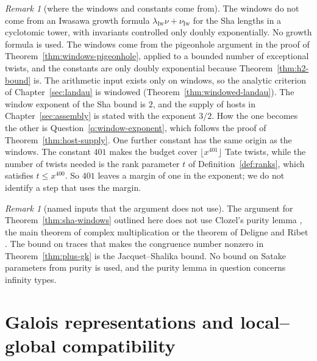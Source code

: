\documentclass[11pt]{amsbook}
\theoremstyle{plain}
\theoremstyle{definition}
\theoremstyle{remark}
\newtheorem{remark}[theorem]{Remark}
\numberwithin{equation}{section}
\numberwithin{figure}{chapter}
\numberwithin{table}{chapter}
\begin{document}
\begin{remark}[where the windows and constants come from]
\label{rem:windows-origin}
The windows do not come from an Iwasawa growth formula
$\lambda_{\mathrm{Iw}}\nu+\nu_{\mathrm{Iw}}$ for the Sha lengths in a
cyclotomic tower, with invariants controlled only doubly
exponentially. No growth formula is used. The windows come from
the pigeonhole argument in the proof of
Theorem~\ref{thm:windows-pigeonhole}, applied to a bounded number of
exceptional twists, and the constants are only doubly exponential
because Theorem~\ref{thm:h2-bound} is. The arithmetic input exists
only on windows, so the analytic criterion of
Chapter~\ref{sec:landau} is windowed
(Theorem~\ref{thm:windowed-landau}). The window exponent of the Sha bound is
$2$, and the
supply of hosts in Chapter~\ref{sec:assembly} is stated with the
exponent $3/2$. How the one becomes the other is
Question~\ref{q:window-exponent}, which follows the proof of
Theorem~\ref{thm:host-supply}. One further constant has the
same origin as the windows. The constant $401$ makes the
budget cover $\lfloor x^{401}\rfloor$ Tate twists, while the number of
twists needed is the rank parameter $t$ of
Definition~\ref{def:ranks}, which satisfies $t\le x^{400}$. So $401$
leaves a margin of one in the exponent; we do not identify a step
that uses the margin.
\end{remark}

\begin{remark}[named inputs that the argument does not use]
\label{rem:unused-inputs}
The argument for Theorem~\ref{thm:sha-windows} outlined here does not
use Clozel's purity lemma \cite{Clozel1990}, the main theorem of
complex multiplication or the theorem of Deligne and Ribet
\cite{DeligneRibet1980}. The bound on traces that makes the
congruence number nonzero in Theorem~\ref{thm:plus-gk} is the
Jacquet--Shalika bound. No bound on Satake parameters from purity is
used, and the purity lemma in question concerns infinity types.
\end{remark}
\clearpage
\clearpage
\chapter{Galois representations and local--global compatibility}
\label{ch:galois}\label{sec:galois}
\end{document}
